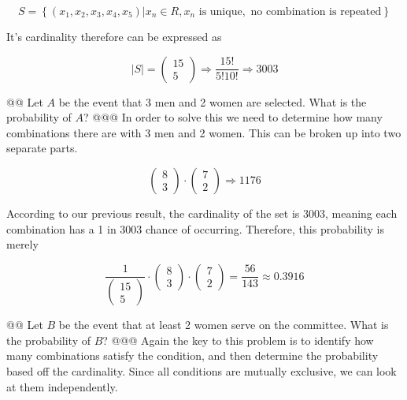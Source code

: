 \documentclass[10pt]{article}
\begin{document}
\begin{easylist}[enumerate]
        \[ S = \left\{ (x_1, x_2, x_3, x_4, x_5) | x_n \in R, x_n \text{ is unique}, \text{ no combination is repeated} \right\} \]

    It's cardinality therefore can be expressed as

        \[ |S| = \begin{pmatrix}15\\5\end{pmatrix} \Rightarrow \frac{15!}{5!10!} \Rightarrow 3003 \]

    @@ Let $A$ be the event that 3 men and 2 women are selected. What is the probability of $A$?
    @@@ In order to solve this we need to determine how many combinations there are with 3 men and 2 women. This can be broken up into two separate parts.

        \[ \begin{pmatrix}8\\3\end{pmatrix} \cdot \begin{pmatrix}7\\2\end{pmatrix} \Rightarrow 1176 \]

        According to our previous result, the cardinality of the set is 3003, meaning each combination has a 1 in 3003 chance of occurring. Therefore, this probability is merely

        \[ \frac{1}{\begin{pmatrix}15\\5\end{pmatrix}} \cdot \begin{pmatrix}8\\3\end{pmatrix} \cdot \begin{pmatrix}7\\2\end{pmatrix} = \boxed{\frac{56}{143} \approx 0.3916} \]

    @@ Let $B$ be the event that at least 2 women serve on the committee. What is the probability of $B$?
    @@@ Again the key to this problem is to identify how many combinations satisfy the condition, and then determine the probability based off the cardinality. Since all conditions are mutually exclusive, we can look at them independently.


\end{easylist}
\end{document}
